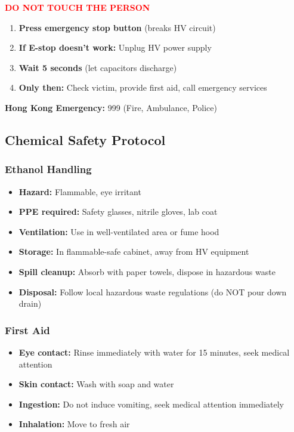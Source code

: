 \documentclass[11pt]{article}
\begin{document}
\begin{center}
\textcolor{red}{\textbf{DO NOT TOUCH THE PERSON}}
\end{center}

\begin{enumerate}
\item \textbf{Press emergency stop button} (breaks HV circuit)
\item \textbf{If E-stop doesn't work:} Unplug HV power supply
\item \textbf{Wait 5 seconds} (let capacitors discharge)
\item \textbf{Only then:} Check victim, provide first aid, call emergency services
\end{enumerate}

\textbf{Hong Kong Emergency:} 999 (Fire, Ambulance, Police)

\subsection{Chemical Safety Protocol}

\subsubsection{Ethanol Handling}

\begin{itemize}
\item \textbf{Hazard:} Flammable, eye irritant
\item \textbf{PPE required:} Safety glasses, nitrile gloves, lab coat
\item \textbf{Ventilation:} Use in well-ventilated area or fume hood
\item \textbf{Storage:} In flammable-safe cabinet, away from HV equipment
\item \textbf{Spill cleanup:} Absorb with paper towels, dispose in hazardous waste
\item \textbf{Disposal:} Follow local hazardous waste regulations (do NOT pour down drain)
\end{itemize}

\subsubsection{First Aid}

\begin{itemize}
\item \textbf{Eye contact:} Rinse immediately with water for 15 minutes, seek medical attention
\item \textbf{Skin contact:} Wash with soap and water
\item \textbf{Ingestion:} Do not induce vomiting, seek medical attention immediately
\item \textbf{Inhalation:} Move to fresh air
\end{itemize}
\end{document}

